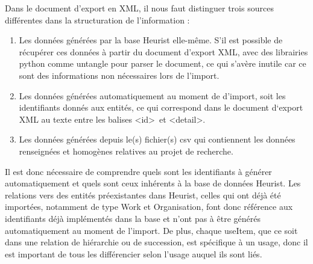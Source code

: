 \documentclass[a4paper,12pt,twoside]{book}
\begin{document}
Dans le document d'export en XML, il nous faut distinguer trois sources différentes dans la structuration de l'information :
\begin{enumerate}
    \item Les données générées par la base Heurist elle-même. S'il est possible de récupérer ces données à partir du document d'export XML, avec des librairies python comme untangle pour parser le document, ce qui s'avère inutile car ce sont des informations non nécessaires lors de l'import.
    \item Les données générées automatiquement au moment de d'import, soit les identifiants donnés aux entités, ce qui correspond dans le document d‘export XML au texte entre les balises \textless id\textgreater~et \textless detail\textgreater .
    \item Les données générées depuis le(s) fichier(s) csv qui contiennent les données renseignées et homogènes relatives au projet de recherche.
\end{enumerate}
Il est donc nécessaire de comprendre quels sont les identifiants à générer automatiquement et quels sont ceux inhérents à la base de données Heurist. Les relations vers des entités préexistantes dans Heurist, celles qui ont déjà été importées, notamment de type \og Work\fg{} et \og Organisation\fg{}, font donc référence aux identifiants déjà implémentés dans la base et n'ont pas à être générés automatiquement au moment de l'import. De plus, chaque \og useItem\fg{}, que ce soit dans une relation de hiérarchie ou de succession, est spécifique à un usage, donc il est important de tous les différencier selon l’usage auquel ils sont liés. \\
\end{document}
